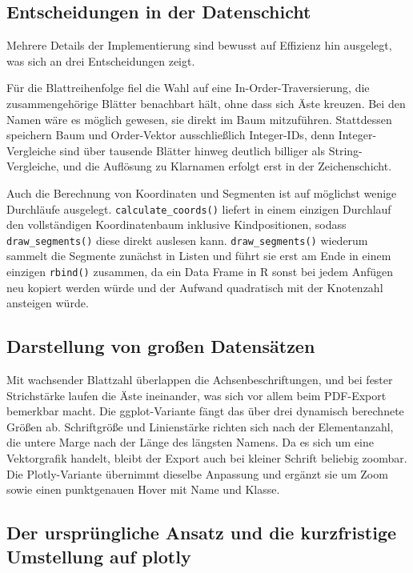 \documentclass[11pt,a4paper]{article}
\newcommand{\code}[1]{\texttt{#1}}
\begin{document}
	\subsection{Entscheidungen in der Datenschicht}
	
Mehrere Details der Implementierung sind bewusst auf Effizienz hin ausgelegt, 
was sich an drei Entscheidungen zeigt.

Für die Blattreihenfolge fiel die Wahl auf eine In-Order-Traversierung, die 
zusammengehörige Blätter benachbart hält, ohne dass sich Äste kreuzen. Bei den 
Namen wäre es möglich gewesen, sie direkt im Baum mitzuführen. Stattdessen 
speichern Baum und Order-Vektor ausschließlich Integer-IDs, denn Integer-Vergleiche 
sind über tausende Blätter hinweg deutlich billiger als String-Vergleiche, und die 
Auflösung zu Klarnamen erfolgt erst in der Zeichenschicht.

Auch die Berechnung von Koordinaten und Segmenten ist auf möglichst wenige 
Durchläufe ausgelegt. \code{calculate\_coords()} liefert in einem einzigen 
Durchlauf den vollständigen Koordinatenbaum inklusive Kindpositionen, sodass 
\code{draw\_segments()} diese direkt auslesen kann. \code{draw\_segments()} 
wiederum sammelt die Segmente zunächst in Listen und führt sie erst am Ende in 
einem einzigen \code{rbind()} zusammen, da ein Data Frame in R sonst bei jedem 
Anfügen neu kopiert werden würde und der Aufwand quadratisch mit der Knotenzahl ansteigen würde.
	
	\subsection{Darstellung von großen Datensätzen}
	
Mit wachsender Blattzahl überlappen die Achsenbeschriftungen, und bei fester 
Strichstärke laufen die Äste ineinander, was sich vor allem beim PDF-Export 
bemerkbar macht. Die ggplot-Variante fängt das über drei dynamisch berechnete 
Größen ab. Schriftgröße und Linienstärke richten sich nach der Elementanzahl, die 
untere Marge nach der Länge des längsten Namens. Da es sich um eine Vektorgrafik 
handelt, bleibt der Export auch bei kleiner Schrift beliebig zoombar. Die 
Plotly-Variante übernimmt dieselbe Anpassung und ergänzt sie um Zoom sowie einen 
punktgenauen Hover mit Name und Klasse. 
	\subsection{Der ursprüngliche Ansatz und die kurzfristige Umstellung auf plotly}
	
\end{document}

